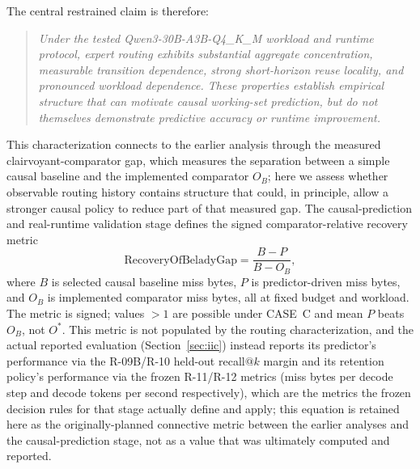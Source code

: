 The central restrained claim is therefore:

\begin{quote}
\emph{Under the tested Qwen3-30B-A3B-Q4\_K\_M workload and runtime
protocol, expert routing exhibits substantial aggregate concentration,
measurable transition dependence, strong short-horizon reuse locality, and
pronounced workload dependence. These properties establish empirical
structure that can motivate causal working-set prediction, but do not
themselves demonstrate predictive accuracy or runtime improvement.}
\end{quote}

This characterization connects to the earlier analysis through the measured
clairvoyant-comparator gap, which measures the separation between a simple
causal baseline and the implemented comparator $O_B$; here we assess whether
observable routing history contains structure that could, in principle,
allow a stronger causal policy to reduce part of that measured gap.
The causal-prediction and real-runtime validation stage defines the signed
comparator-relative recovery metric
\begin{equation}
\label{eq:comparator-relative-recovery}
\mathrm{RecoveryOfBeladyGap}
  = \frac{B - P}{B - O_B},
\end{equation}
where $B$ is selected causal baseline miss bytes, $P$ is predictor-driven
miss bytes, and $O_B$ is implemented comparator miss bytes, all at fixed
budget and workload. The metric is signed; values $>1$ are possible under
CASE~C and mean $P$ beats $O_B$, not $O^*$. This metric is not populated
by the routing characterization, and the actual reported evaluation
(Section~\ref{sec:iic}) instead reports its predictor's performance via the
R-09B/R-10 held-out recall$@k$ margin and its retention policy's
performance via the frozen R-11/R-12 metrics
(miss bytes per decode step and decode tokens per second respectively),
which are the
metrics the frozen decision rules for that stage actually define and
apply; this equation is retained here as the originally-planned
connective metric between the earlier analyses and the causal-prediction
stage, not as a value that was ultimately computed and reported.